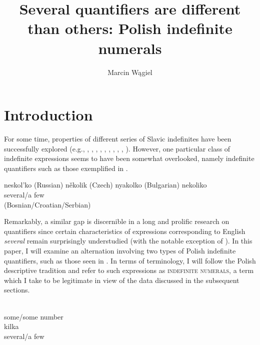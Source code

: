\documentclass[output=paper,
]{langscibook}
\title{Several quantifiers are different than others: Polish indefinite numerals}
\author{Marcin Wągiel\affiliation{Masaryk University in Brno}}
\begin{document}
	\maketitle
	
	\section{Introduction}\label{introduction}

	For some time, properties of different series of Slavic indefinites have been successfully explored (e.g., \citealt{blaszczak2001investigation}, \citealt{testelets_bylinina2005sluicing}, \citealt{yanovich2005choice}, \citealt{geist2008specificity}, \citealt{pereltsvaig2008russian}, \citealt{eremina2012semantics}, \citealt{docekal_strachonova2015freedom}, \citealt{richtarcikova2015epistemic}, \citealt{simik2015epistemic}, \citealt{strachonova2016ceska}). However, one particular class of indefinite expressions seems to have been somewhat overlooked, namely indefinite quantifiers such as those exemplified in . 
	
	\ea \label{ex:slavic-indefinite-quantifiers} \ea neskol'ko \hfill (Russian)
	\ex několik \hfill (Czech)
	\ex nyakolko \hfill (Bulgarian)
	\ex \gll nekoliko\\ 
	several/a few\\ \hfill (Bosnian/Croatian/Serbian)
    \z
    \z
	
	\noindent Remarkably, a similar gap is discernible in a long and prolific research on quantifiers since certain characteristics of expressions corresponding to English \textit{several} remain surprisingly understudied (with the notable exception of \citealt{kayne2007several}). In this paper, I will examine an alternation involving two types of Polish indefinite quantifiers, such as those seen in . In terms of terminology, I will follow the Polish descriptive tradition and refer to such expressions as \textsc{indefinite numerals}, a term which I take to be legitimate in view of the data discussed in the subsequent sections. 
	
	\ea \label{ex:polish-indefinite-quantifiers} \ea \gll {}\\
	some/some number\\
	\ex \gll kilka\\
	several/a few\\
    \z
    \z
	
\end{document}
